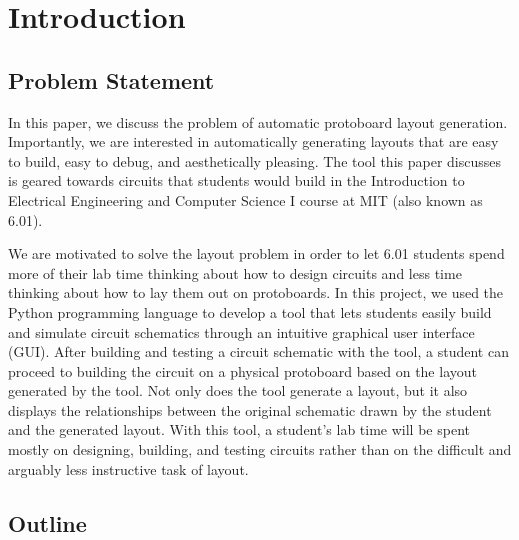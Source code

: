 

\chapter{Introduction}
\label{ch:intro}

\section{Problem Statement}

In this paper, we discuss the problem of automatic protoboard layout generation.
Importantly, we are interested in automatically generating layouts that are
easy to build, easy to debug, and aesthetically pleasing. The tool this
paper discusses
is geared towards circuits that students would build in the
Introduction to Electrical Engineering and Computer Science I\cite{sixohone} 
course at MIT (also known as 6.01).

We are motivated to solve the layout
problem in order to let 6.01 students spend more of their lab time thinking
about how to design
circuits and less time thinking about how to lay them out on protoboards.
In this project, we used the Python programming language to develop a tool
that lets students easily build and
simulate circuit schematics through an intuitive graphical user interface (GUI).
After building and testing a circuit schematic with the tool, a student can
proceed to building the circuit on a physical protoboard based on the layout
generated by the tool. Not only does the tool generate a layout, but it
also displays the relationships between the original schematic drawn by the
student and the generated layout.
With this tool, a student's lab time will be spent mostly
on designing, building, and testing circuits rather than on the difficult and
arguably less instructive task of layout.

\section{Outline}

